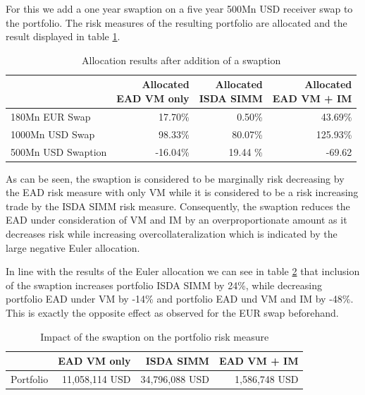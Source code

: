 \documentclass[../Thesis_AHoecherl.tex]{subfiles}
\begin{document}
    For this we add a one year swaption on a five year 500Mn USD receiver swap to the portfolio. The risk measures of the resulting portfolio are allocated and the result displayed in table \ref{tab:3TradeRatesAllocation}.

    \begin{table}[htbp]
        \centering
        \begin{tabular}{l||r|r|r}
                & \makecell{Allocated \\ \gls{EAD} \gls{VM} only} &\makecell{Allocated \\ \gls{ISDA SIMM}} &\makecell{Allocated \\ \gls{EAD} \gls{VM} + IM} \\
                \toprule
        180Mn EUR Swap & 17.70\% & 0.50\% & 43.69\% \\
        1000Mn USD Swap & 98.33\% & 80.07\% & 125.93\% \\
        500Mn USD Swaption & -16.04\% & 19.44 \% & -69.62\\
        \end{tabular}%
        \caption{Allocation results after addition of a swaption}
        \label{tab:3TradeRatesAllocation}%
    \end{table}%
    As can be seen, the swaption is considered to be marginally risk decreasing by the \gls{EAD} risk measure with only \gls{VM} while it is considered to be a risk increasing trade by the \gls{ISDA SIMM} risk measure. Consequently, the swaption reduces the \gls{EAD} under consideration of \gls{VM} and \gls{IM} by an overproportionate amount as it decreases risk while increasing overcollateralization which is indicated by the large negative Euler allocation.

    In line with the results of the Euler allocation we can see in table \ref{tab:3TradeRatesResults} that inclusion of the swaption increases portfolio \gls{ISDA SIMM} by 24\%, while decreasing portfolio \gls{EAD} under \gls{VM} by -14\% and portfolio \gls{EAD} und \gls{VM} and \gls{IM} by -48\%. This is exactly the opposite effect as observed for the EUR swap beforehand.

    \begin{table}[htbp]
        \centering
        \begin{tabular}{l||r|r|r}
                & \gls{EAD} \gls{VM} only &\gls{ISDA SIMM} & \gls{EAD} \gls{VM} + \gls{IM} \\
                \toprule
        Portfolio & 11,058,114 USD & 34,796,088 USD & 1,586,748 USD \\
        \end{tabular}%
        \caption{Impact of the swaption on the portfolio risk measure}
        \label{tab:3TradeRatesResults}%
    \end{table}%
\end{document}
